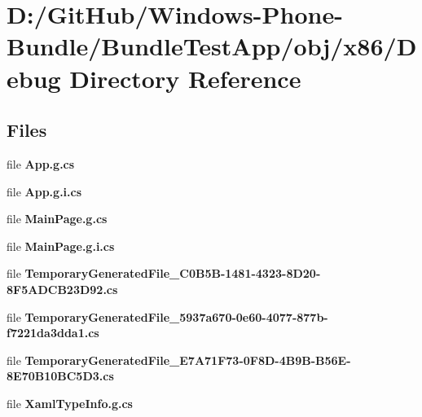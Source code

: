 \section{D\+:/\+Git\+Hub/\+Windows-\/\+Phone-\/\+Bundle/\+Bundle\+Test\+App/obj/x86/\+Debug Directory Reference}
\label{dir_cc5fff42ff5bbd72f3fbe99333a68421}
\subsection*{Files}
\begin{DoxyCompactItemize}
\item 
file {\bfseries App.\+g.\+cs}
\item 
file {\bfseries App.\+g.\+i.\+cs}
\item 
file {\bfseries Main\+Page.\+g.\+cs}
\item 
file {\bfseries Main\+Page.\+g.\+i.\+cs}
\item 
file {\bfseries Temporary\+Generated\+File\+\_\+C0\+B5\+B-\/1481-\/4323-\/8\+D20-\/8\+F5\+A\+D\+C\+B23\+D92.\+cs}
\item 
file {\bfseries Temporary\+Generated\+File\+\_\+5937a670-\/0e60-\/4077-\/877b-\/f7221da3dda1.\+cs}
\item 
file {\bfseries Temporary\+Generated\+File\+\_\+\+E7\+A71\+F73-\/0\+F8\+D-\/4\+B9\+B-\/\+B56\+E-\/8\+E70\+B10\+B\+C5\+D3.\+cs}
\item 
file {\bfseries Xaml\+Type\+Info.\+g.\+cs}
\end{DoxyCompactItemize}
